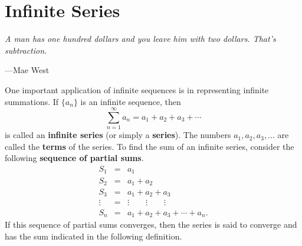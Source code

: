 \documentclass[titlepage,a4paper,12pt]{report}
\begin{document}
\chapter{Infinite Series}
\begin{center}
\small{\parbox{18cm}{
		\begin{raggedright}
		{\small
		\textit{A man has one hundred dollars and you leave him with two dollars.  That's subtraction.}
 }
 
				\vspace{.5cm}\hfill{---Mae West}
		\end{raggedright}
	}
} 
\end{center}
One important application of infinite sequences is in representing infinite summations. If $\{a_n\}$ is an infinite sequence, then 
\[\sum _{n=1}^\infty a_n=a_1+a_2+a_3+\cdots \]
is called an \textbf{infinite series} (or simply a \textbf{series}). The numbers $a_1, a_2, a_3, \dots$ are called the \textbf{terms} of the series. To find the sum of an infinite series, consider the following \textbf{sequence of partial sums}.
\begin{eqnarray*}
S_1 &=& a_1\\
S_2 &=& a_1 +a_2 \\
S_3 &=& a_1 +a_2 +a_3 \\
\vdots &=& \vdots \quad \quad  \vdots \quad \quad \vdots \\
S_n &=& a_1 +a_2 +a_3 + \cdots + a_n.
\end{eqnarray*}
If this sequence of partial sums converges, then the series is said to converge and has the sum indicated in the following definition.
\end{document}
